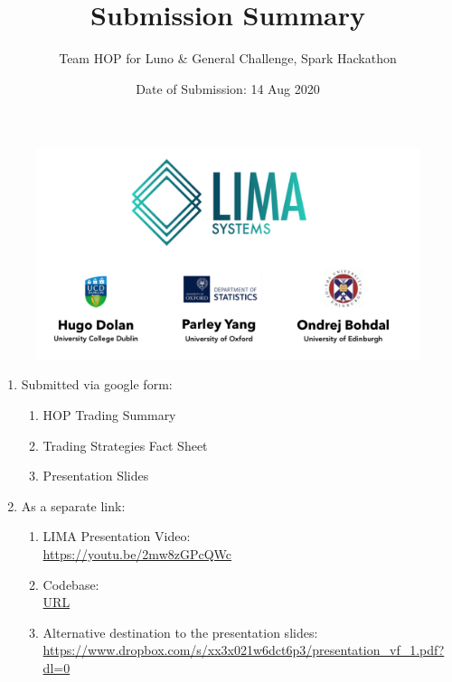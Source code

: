 \documentclass[12pt,a4paper]{article}
\author{%
	Team HOP for Luno \& General Challenge, Spark Hackathon }
\title{Submission Summary}
\date{Date of Submission: 14 Aug 2020}
\begin{document}
\maketitle

\begin{figure}[h]
	\centering
	\includegraphics[width=\linewidth]{../Logo}
\end{figure}



\vfill
\begin{enumerate}
	\item Submitted via google form:
\begin{enumerate}
	\item 	HOP Trading Summary
	\item Trading Strategies Fact Sheet
	\item Presentation Slides 
\end{enumerate}
\item As a separate link:
\begin{enumerate}
	\item LIMA Presentation Video: \\ \url{https://youtu.be/2mw8zGPcQWc}
	\item Codebase: \\
	\url{URL}
	\item Alternative destination to the presentation slides: \\ \url{https://www.dropbox.com/s/xx3x021w6dct6p3/presentation_vf_1.pdf?dl=0} 
\end{enumerate}
\end{enumerate}

\vfill

\thispagestyle{empty}
\end{document}
